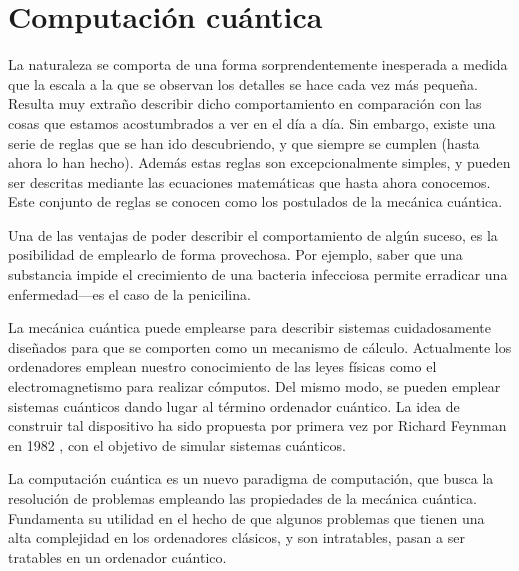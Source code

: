 \chapter{Computación cuántica}




La naturaleza se comporta de una forma sorprendentemente inesperada a medida que 
la escala a la que se observan los detalles se hace cada vez más pequeña.  
Resulta muy extraño describir dicho comportamiento en comparación con las cosas 
que estamos acostumbrados a ver en el día a día. Sin embargo, existe una serie 
de reglas que se han ido descubriendo, y que siempre se cumplen (hasta ahora lo 
han hecho). Además estas reglas son excepcionalmente simples, y pueden ser 
descritas mediante las ecuaciones matemáticas que hasta ahora conocemos. Este 
conjunto de reglas se conocen como los postulados de la mecánica cuántica.

Una de las ventajas de poder describir el comportamiento de algún suceso, es la 
posibilidad de emplearlo de forma provechosa. Por ejemplo, saber que una 
substancia impide el crecimiento de una bacteria infecciosa permite erradicar 
una enfermedad---es el caso de la penicilina.

La mecánica cuántica puede emplearse para describir sistemas cuidadosamente 
diseñados para que se comporten como un mecanismo de cálculo. Actualmente los 
ordenadores emplean nuestro conocimiento de las leyes físicas como el 
electromagnetismo para realizar cómputos. Del mismo modo, se pueden emplear 
sistemas cuánticos dando lugar al término ordenador cuántico. La idea de 
construir tal dispositivo ha sido propuesta por primera vez por Richard Feynman 
en 1982 \cite{feynman-sim}, con el objetivo de simular sistemas cuánticos.

La computación cuántica es un nuevo paradigma de computación, que busca la
resolución de problemas empleando las propiedades de la mecánica cuántica.
Fundamenta su utilidad en el hecho de que algunos problemas que tienen una alta
complejidad en los ordenadores clásicos, y son intratables, pasan a ser
tratables en un ordenador cuántico.

